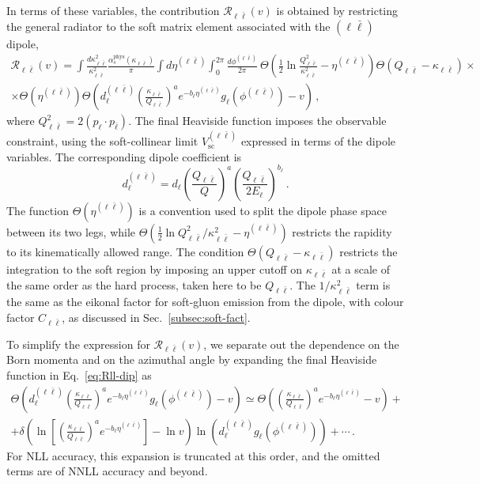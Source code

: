 In terms of these variables, the contribution
$\mathcal{R}_{\ell\bar\ell}(v)$ is obtained by restricting the general
radiator to the soft matrix element associated with the
$(\ell\bar\ell)$ dipole, 
\begin{multline}
\label{eq:Rll-dip}
  \mathcal{R}_{\ell\bar\ell}(v) = \int \frac{d\kappa_{\ell\bar{\ell}}^2}{\kappa_{\ell\bar{\ell}}^2} \frac{\alpha^{\mathrm{phys}}_s(\kappa_{\ell\bar\ell})}{\pi} \int d\eta^{(\ell\bar \ell)}\int_0^{2\pi}\frac{d\phi^{(\ell\bar \ell)}}{2\pi}\
  \Theta\left(\frac 12\ln\frac{Q^2_{\ell\bar\ell}}{\kappa_{\ell\bar \ell}^2}-\eta^{(\ell\bar \ell)}
  \right) \Theta(Q_{\ell \bar\ell}-\kappa_{\ell\bar \ell}) \times \\
  \times \Theta(\eta^{(\ell\bar \ell)})
  \Theta\left(d^{(\ell\bar\ell)}_\ell\left(\frac{\kappa_{\ell\bar
          \ell}}{Q_{\ell\bar\ell}}\right)^{a}
    e^{-b_\ell\eta^{(\ell\bar \ell)}} g_\ell(\phi^{(\ell\bar\ell)})-v\right)\,,
\end{multline}
where $Q_{\ell\bar\ell}^2 = 2(p_\ell\cdot p_{\bar\ell})$. 
The final Heaviside function imposes the observable constraint, using the soft-collinear limit $V_{\mathrm{sc}}^{(\ell\bar\ell)}$ expressed in terms of the dipole variables. The corresponding dipole coefficient is
\begin{equation}
\label{eq:dll}
    d^{(\ell\bar{\ell})}_\ell = d_\ell 
    \left(\frac{Q_{\ell\bar{\ell}}}{Q}\right)^a 
    \left(\frac{Q_{\ell\bar{\ell}}}{2E_\ell}\right)^{b_\ell}\,.
\end{equation}
The function $\Theta(\eta^{(\ell\bar\ell)})$ is a convention used to split
the dipole phase space between its two legs, while
$\Theta\left(\frac{1}{2}\ln Q^2_{\ell\bar\ell}/\kappa_{\ell\bar\ell}^2
-\eta^{(\ell\bar\ell)}\right)$ restricts the rapidity to its
kinematically allowed range. The condition
$\Theta(Q_{\ell\bar\ell}-\kappa_{\ell\bar\ell})$ restricts the integration
to the soft region by imposing an upper cutoff on
$\kappa_{\ell\bar\ell}$ at a scale of the same order as the hard process, 
taken here to be $Q_{\ell\bar\ell}$. The
$1/\kappa_{\ell\bar\ell}^2$ term is the same as the eikonal factor for
soft-gluon emission from the dipole, with colour factor
$C_{\ell\bar\ell}$, as discussed in Sec.~\ref{subsec:soft-fact}.

To simplify the expression for $\mathcal{R}_{\ell\bar\ell}(v)$, we
separate out the dependence on the Born momenta and on the azimuthal
angle by expanding the final Heaviside function in
Eq.~\eqref{eq:Rll-dip} as
\begin{multline}
\Theta\left(d^{(\ell\bar\ell)}_\ell\left(\frac{\kappa_{\ell\bar\ell}}{Q_{\ell\bar\ell}}\right)^{a}
e^{-b_\ell\eta^{(\ell\bar \ell)}} g_\ell(\phi^{(\ell \bar \ell)})-v\right)\simeq\Theta\left(\left(\frac{\kappa_{\ell\bar\ell}}{Q_{\ell\bar\ell}}\right)^{a}e^{-b_\ell\eta^{(\ell\bar \ell)}}-v\right)+\\
+\delta\left(\ln\left[\left(\frac{\kappa_{\ell\bar\ell}}{Q_{\ell\bar\ell}}\right)^ae^{-b_\ell\eta^{(\ell\bar \ell)}}\right]-\ln v\right)\ln\left(d^{(\ell\bar\ell)}_\ell g_\ell(\phi^{(\ell \bar \ell)})\right)+\cdots\,.
\end{multline}
For NLL accuracy, this expansion is truncated at this order, and the omitted terms are of NNLL accuracy and beyond. 

